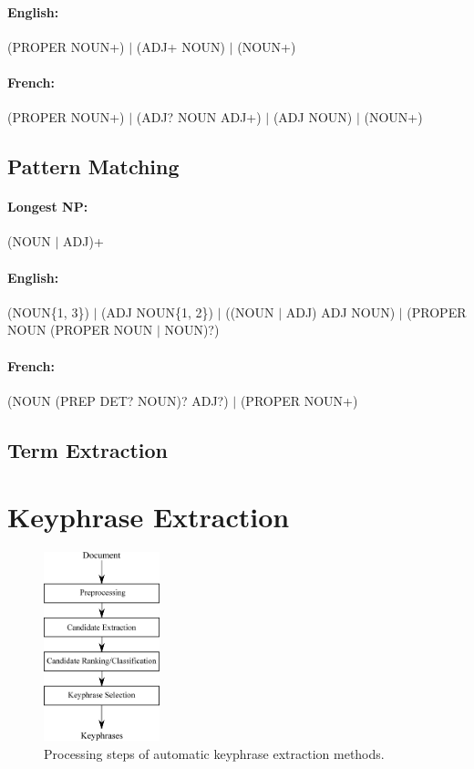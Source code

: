     \paragraph{English:} (PROPER NOUN+) $|$ (ADJ+ NOUN) $|$ (NOUN+)
    \paragraph{French:} (PROPER NOUN+) $|$ (ADJ? NOUN ADJ+) $|$ (ADJ NOUN) $|$ (NOUN+)

  \subsection{Pattern Matching}
  \label{subsec:pattern_matching}
    \paragraph{Longest NP:} (NOUN $|$ ADJ)+
    \paragraph{English:} (NOUN\{1, 3\}) $|$ (ADJ NOUN\{1, 2\}) $|$ ((NOUN $|$ ADJ) ADJ NOUN) $|$ (PROPER NOUN (PROPER NOUN $|$ NOUN)?)
    \paragraph{French:} (NOUN (PREP DET? NOUN)? ADJ?) $|$ (PROPER NOUN+)

  \subsection{Term Extraction}
  \label{subsec:term_extraction}

\section{Keyphrase Extraction}
\label{sec:keyphrase_extraction}
  \begin{figure}
    \centering
    \includegraphics[width=0.3\textwidth]{include/processing_steps.eps}
    \caption{Processing steps of automatic keyphrase extraction methods.
             \label{fig:processing_steps}}
  \end{figure}

